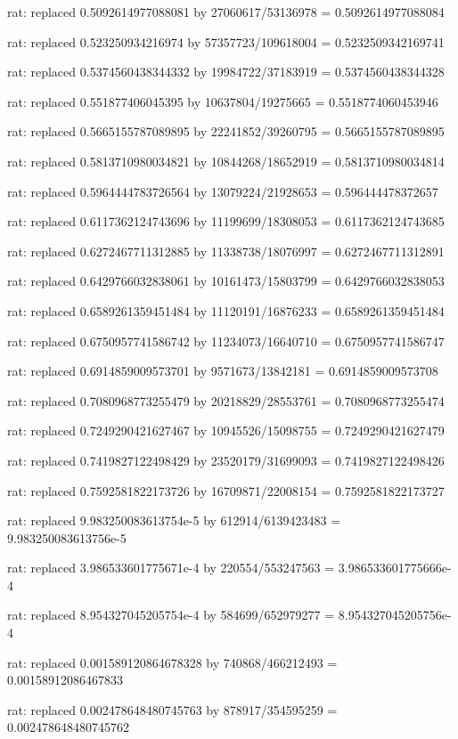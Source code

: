 \documentclass[a4paper,10pt]{article}
\begin{document}
\begin{eulernotebook}
\begin{eulercomment}
\begin{eulercomment}
\begin{eulercomment}
\begin{eulercomment}
\begin{eulercomment}
\begin{eulercomment}
\begin{eulercomment}
\begin{eulercomment}
\begin{eulercomment}
\begin{eulercomment}
\begin{eulercomment}
\begin{eulercomment}
\begin{eulercomment}
\begin{eulercomment}
\begin{eulercomment}
\begin{eulercomment}
\begin{euleroutput}
  rat: replaced 0.5092614977088081 by 27060617/53136978 = 0.5092614977088084
  
  rat: replaced 0.523250934216974 by 57357723/109618004 = 0.5232509342169741
  
  rat: replaced 0.5374560438344332 by 19984722/37183919 = 0.5374560438344328
  
  rat: replaced 0.551877406045395 by 10637804/19275665 = 0.5518774060453946
  
  rat: replaced 0.5665155787089895 by 22241852/39260795 = 0.5665155787089895
  
  rat: replaced 0.5813710980034821 by 10844268/18652919 = 0.5813710980034814
  
  rat: replaced 0.5964444783726564 by 13079224/21928653 = 0.596444478372657
  
  rat: replaced 0.6117362124743696 by 11199699/18308053 = 0.6117362124743685
  
  rat: replaced 0.6272467711312885 by 11338738/18076997 = 0.6272467711312891
  
  rat: replaced 0.6429766032838061 by 10161473/15803799 = 0.6429766032838053
  
  rat: replaced 0.6589261359451484 by 11120191/16876233 = 0.6589261359451484
  
  rat: replaced 0.6750957741586742 by 11234073/16640710 = 0.6750957741586747
  
  rat: replaced 0.6914859009573701 by 9571673/13842181 = 0.6914859009573708
  
  rat: replaced 0.7080968773255479 by 20218829/28553761 = 0.7080968773255474
  
  rat: replaced 0.7249290421627467 by 10945526/15098755 = 0.7249290421627479
  
  rat: replaced 0.7419827122498429 by 23520179/31699093 = 0.7419827122498426
  
  rat: replaced 0.7592581822173726 by 16709871/22008154 = 0.7592581822173727
  
  rat: replaced 9.983250083613754e-5 by 612914/6139423483 = 9.983250083613756e-5
  
  rat: replaced 3.986533601775671e-4 by 220554/553247563 = 3.986533601775666e-4
  
  rat: replaced 8.954327045205754e-4 by 584699/652979277 = 8.954327045205756e-4
  
  rat: replaced 0.001589120864678328 by 740868/466212493 = 0.00158912086467833
  
  rat: replaced 0.002478648480745763 by 878917/354595259 = 0.002478648480745762
  

\end{euleroutput}
\end{eulercomment}
\end{eulercomment}
\end{eulercomment}
\end{eulercomment}
\end{eulercomment}
\end{eulercomment}
\end{eulercomment}
\end{eulercomment}
\end{eulercomment}
\end{eulercomment}
\end{eulercomment}
\end{eulercomment}
\end{eulercomment}
\end{eulercomment}
\end{eulercomment}
\end{eulercomment}
\end{eulernotebook}
\end{document}
